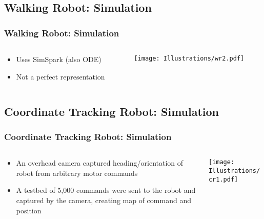 \documentclass{beamer}
\begin{document}
\subsection*{Walking Robot: Simulation}
\begin{frame}
  \frametitle{Walking Robot: Simulation}
\begin{columns}
  \begin{column}{0.5\textwidth}
\begin{itemize}
\item  Uses SimSpark (also ODE)
\item  Not a perfect representation
\end{itemize}
\end{column}
\begin{column}{0.5\textwidth}
 \texttt{[image: Illustrations/wr2.pdf]}
       \\
\end{column}
\end{columns}
\end{frame}

\subsection*{Coordinate Tracking Robot: Simulation}
\begin{frame}
  \frametitle{Coordinate Tracking Robot: Simulation}
\begin{columns}
  \begin{column}{0.5\textwidth}
\begin{itemize}
\item An overhead camera captured heading/orientation of robot from arbitrary motor commands
\item A testbed of 5,000 commands were sent to the robot and captured by the camera, creating map of command and position
\end{itemize}
\end{column}
\begin{column}{0.5\textwidth}
 \texttt{[image: Illustrations/cr1.pdf]}
       \\
\end{column}
\end{columns}

\end{frame}
\end{document}
